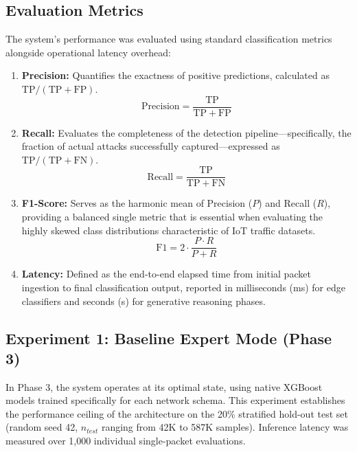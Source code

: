 \documentclass[conference]{IEEEtran}
\begin{document}
\subsection{Evaluation Metrics}
The system's performance was evaluated using standard classification metrics alongside operational latency overhead:
\begin{enumerate}
    \item \textbf{Precision:} Quantifies the exactness of positive predictions, calculated as $\mathrm{TP} / (\mathrm{TP} + \mathrm{FP})$.
          \begin{equation}
              \mathrm{Precision} = \frac{\mathrm{TP}}{\mathrm{TP} + \mathrm{FP}}
          \end{equation}
    \item \textbf{Recall:} Evaluates the completeness of the detection pipeline---specifically, the fraction of actual attacks successfully captured---expressed as $\mathrm{TP} / (\mathrm{TP} + \mathrm{FN})$.
          \begin{equation}
              \mathrm{Recall} = \frac{\mathrm{TP}}{\mathrm{TP} + \mathrm{FN}}
          \end{equation}
    \item \textbf{F1-Score:} Serves as the harmonic mean of Precision ($P$) and Recall ($R$), providing a balanced single metric that is essential when evaluating the highly skewed class distributions characteristic of IoT traffic datasets.
          \begin{equation}
              \mathrm{F1} = 2 \cdot \frac{P \cdot R}{P + R}
          \end{equation}
    \item \textbf{Latency:} Defined as the end-to-end elapsed time from initial packet ingestion to final classification output, reported in milliseconds (ms) for edge classifiers and seconds (s) for generative reasoning phases.
\end{enumerate}

\subsection{Experiment 1: Baseline Expert Mode (Phase 3)}
In Phase 3, the system operates at its optimal state, using native XGBoost models trained specifically for each network schema. This experiment establishes the performance ceiling of the architecture on the 20\% stratified hold-out test set (random seed 42, $n_{test}$ ranging from 42K to 587K samples). Inference latency was measured over 1,000 individual single-packet evaluations.
\end{document}
